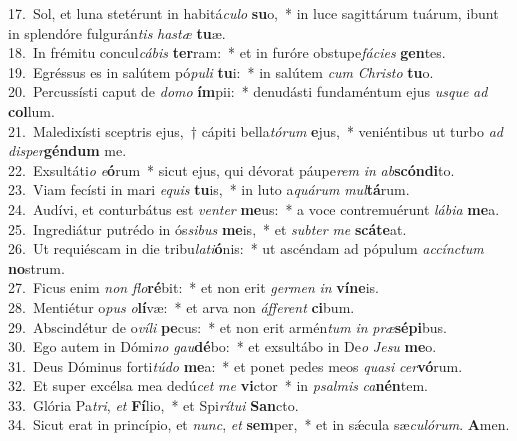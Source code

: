 {17.~}Sol, et luna stetérunt in habitá\textit{cu}\textit{lo} \textbf{su}o,~* in luce sagittárum tuárum, ibunt in splendóre fulgurán\textit{tis} \textit{ha}\textit{stæ} \textbf{tu}æ.\\
{18.~}In frémitu concul\textit{cá}\textit{bis} \textbf{ter}ram:~* et in furóre obstupe\textit{fá}\textit{ci}\textit{es} \textbf{gen}tes.\\
{19.~}Egréssus es in salútem pó\textit{pu}\textit{li} \textbf{tu}i:~* in salútem \textit{cum} \textit{Chri}\textit{sto} \textbf{tu}o.\\
{20.~}Percussísti caput de \textit{do}\textit{mo} \textbf{ím}pii:~* denudásti fundaméntum ejus \textit{us}\textit{que} \textit{ad} \textbf{col}lum.\\
{21.~}Maledixísti sceptris ejus,~† cápiti bella\textit{tó}\textit{rum} \textbf{e}jus,~* veniéntibus ut turbo \textit{ad} \textit{di}\textit{sper}\textbf{gén}\textbf{dum} me.\\
{22.~}Exsultáti\textit{o} \textit{e}\textbf{ó}rum~* sicut ejus, qui dévorat páupe\textit{rem} \textit{in} \textit{ab}\textbf{scón}\textbf{di}to.\\
{23.~}Viam fecísti in mari \textit{e}\textit{quis} \textbf{tu}is,~* in luto a\textit{quá}\textit{rum} \textit{mul}\textbf{tá}rum.\\
{24.~}Audívi, et conturbátus est \textit{ven}\textit{ter} \textbf{me}us:~* a voce contremuérunt \textit{lá}\textit{bi}\textit{a} \textbf{me}a.\\
{25.~}Ingrediátur putrédo in ós\textit{si}\textit{bus} \textbf{me}is,~* et \textit{sub}\textit{ter} \textit{me} \textbf{scá}\textbf{te}at.\\
{26.~}Ut requiéscam in die tribu\textit{la}\textit{ti}\textbf{ó}nis:~* ut ascéndam ad pópulum \textit{ac}\textit{cín}\textit{ctum} \textbf{no}strum.\\
{27.~}Ficus enim \textit{non} \textit{flo}\textbf{ré}bit:~* et non erit \textit{ger}\textit{men} \textit{in} \textbf{ví}\textbf{ne}is.\\
{28.~}Mentiétur o\textit{pus} \textit{o}\textbf{lí}væ:~* et arva non \textit{áf}\textit{fe}\textit{rent} \textbf{ci}bum.\\
{29.~}Abscindétur de o\textit{ví}\textit{li} \textbf{pe}cus:~* et non erit armén\textit{tum} \textit{in} \textit{præ}\textbf{sé}\textbf{pi}bus.\\
{30.~}Ego autem in Dómi\textit{no} \textit{gau}\textbf{dé}bo:~* et exsultábo in De\textit{o} \textit{Je}\textit{su} \textbf{me}o.\\
{31.~}Deus Dóminus forti\textit{tú}\textit{do} \textbf{me}a:~* et ponet pedes meos \textit{qua}\textit{si} \textit{cer}\textbf{vó}rum.\\
{32.~}Et super excélsa mea dedú\textit{cet} \textit{me} \textbf{vi}ctor~* in \textit{psal}\textit{mis} \textit{ca}\textbf{nén}tem.\\
{33.~}Glória Pa\textit{tri}, \textit{et} \textbf{Fí}lio,~* et Spi\textit{rí}\textit{tu}\textit{i} \textbf{San}cto.\\
{34.~}Sicut erat in princípio, et \textit{nunc}, \textit{et} \textbf{sem}per,~* et in sǽcula sæ\textit{cu}\textit{ló}\textit{rum}. \textbf{A}men.\\
